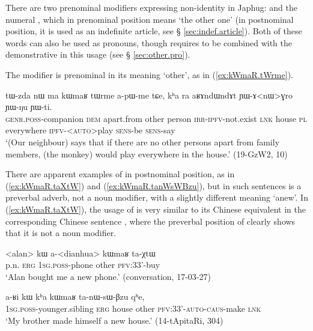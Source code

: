 There are two prenominal modifiers expressing non-identity in Japhug:  and the numeral , which in prenominal position means `the other one' (in postnominal position, it is used as an indefinite article, see § \ref{sec:indef.article}). Both of these words can also be used as pronouns, though  requires to be combined with the demonstrative  in this usage (see § \ref{sec:other.pro}).

The modifier  is prenominal in its meaning `other', as in (\ref{ex:kWmaR.tWrme}). 

\begin{exe}
\ex \label{ex:kWmaR.tWrme}
\gll tɯ-zda nɯ ma kɯmaʁ tɯrme a-pɯ-me tɕe, kʰa ra aʁɤndɯndɤt ɲɯ-ɤ<nɯ>ɣro ɲɯ-ŋu ɲɯ-ti. \\
\textsc{genr}.\textsc{poss}-companion \textsc{dem} apart.from other person \textsc{irr}-\textsc{ipfv}-not.exist \textsc{lnk} house \textsc{pl} everywhere \textsc{ipfv}-<\textsc{auto}>play \textsc{sens}-be \textsc{sens}-say \\
\glt `(Our neighbour) says that if there are no other persons apart from family members, (the monkey) would play everywhere in the house.' (19-GzW2, 10)
\end{exe}

There are apparent examples of  in postnominal position, as in (\ref{ex:kWmaR.taXtW}) and (\ref{ex:kWmaR.tanWsWBzu}), but in such sentences  is a preverbal adverb, not a noun modifier, with a slightly different meaning `anew'. In (\ref{ex:kWmaR.taXtW}), the usage of  is very similar to its Chinese equivalent  in the corresponding Chinese sentence , where the preverbal position of  clearly shows that it is not a noun modifier. 

\begin{exe}
\ex \label{ex:kWmaR.taXtW}
\gll <alan> kɯ a-<dianhua> kɯmaʁ ta-χtɯ \\
p.n. \textsc{erg} \textsc{1sg}.\textsc{poss}-phone other \textsc{pfv}:3\fl{}3'-buy \\
\glt `Alan bought me a new phone.' (conversation, 17-03-27)
\end{exe}

\begin{exe}
\ex \label{ex:kWmaR.tanWsWBzu}
\gll a-ʁi kɯ kʰa kɯmaʁ ta-nɯ-sɯ-βzu qʰe, \\
\textsc{1sg}.\textsc{poss}-younger.sibling \textsc{erg} house other \textsc{pfv}:3\fl{}3'-\textsc{auto}-\textsc{caus}-make \textsc{lnk} \\
\glt `My brother made himself a new house.' (14-tApitaRi, 304)
\end{exe}

